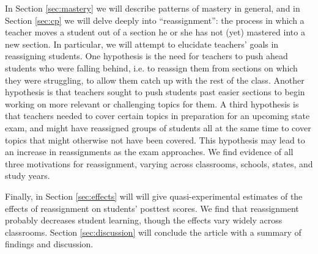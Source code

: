 \documentclass[12pt]{article}\usepackage[]{graphicx}\usepackage[]{color}
\begin{document}
In Section \ref{sec:mastery} we will describe patterns of mastery in general,
and in Section \ref{sec:cp} we will delve deeply into ``reassignment'': the process in which a
teacher moves a student out of a section he or she has not (yet)
mastered into a new section.
In particular, we will attempt to elucidate teachers' goals in
reassigning students. One hypothesis is the need for teachers to push
ahead students who were falling behind, i.e. to reassign them from
sections on which they were struggling, to allow them catch up with
the rest of the class. Another hypothesis is that teachers sought to
push students past easier sections to begin working on more relevant
or challenging topics for them. A third hypothesis is that teachers needed to cover certain topics in preparation for an upcoming state exam, and might have reassigned groups of students all at the same time to cover topics that might otherwise not have been covered. This hypothesis may lead to an increase in reassignments as the exam approaches.
We find evidence of all three motivations for reassignment, varying
across classrooms, schools, states, and study  years.

Finally, in Section \ref{sec:effects} will will give
quasi-experimental estimates of the effects of reassignment on
students' posttest scores.
We find that reassignment probably decreases student learning,
though the effects vary widely across classrooms.
Section \ref{sec:discussion} will conclude the article with a summary
of findings and discussion.
\end{document}
